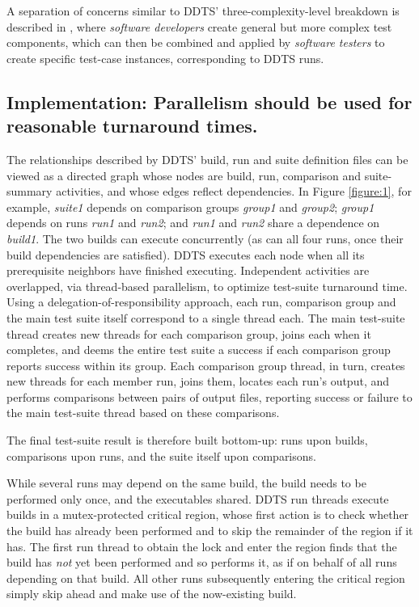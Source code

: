 \documentclass[conference]{IEEEtran}
\begin{document}
A separation of concerns similar to DDTS' three-complexity-level breakdown is described in \cite{rest}, where \emph{software developers} create general but more complex test components, which can then be combined and applied by \emph{software testers} to create specific test-case instances, corresponding to DDTS runs.

\subsection{Implementation: Parallelism should be used for reasonable turnaround times.}

The relationships described by DDTS' build, run and suite definition files can be viewed as a directed graph whose nodes are build, run, comparison and suite-summary activities, and whose edges reflect dependencies. In Figure \ref{figure:1}, for example, \emph{suite1} depends on comparison groups \emph{group1} and \emph{group2}; \emph{group1} depends on runs \emph{run1} and \emph{run2}; and \emph{run1} and \emph{run2} share a dependence on \emph{build1}. The two builds can execute concurrently (as can all four runs, once their build dependencies are satisfied). DDTS executes each node when all its prerequisite neighbors have finished executing. Independent activities are overlapped, via thread-based parallelism, to optimize test-suite turnaround time. Using a delegation-of-responsibility approach, each run, comparison group and the main test suite itself correspond to a single thread each. The main test-suite thread creates new threads for each comparison group, joins each when it completes, and deems the entire test suite a success if each comparison group reports success within its group. Each comparison group thread, in turn, creates new threads for each member run, joins them, locates each run's output, and performs comparisons between pairs of output files, reporting success or failure to the main test-suite thread based on these comparisons.

The final test-suite result is therefore built bottom-up: runs upon builds, comparisons upon runs, and the suite itself upon comparisons.

While several runs may depend on the same build, the build needs to be performed only once, and the executables shared. DDTS run threads execute builds in a mutex-protected critical region, whose first action is to check whether the build has already been performed and to skip the remainder of the region if it has. The first run thread to obtain the lock and enter the region finds that the build has \emph{not} yet been performed and so performs it, as if on behalf of all runs depending on that build. All other runs subsequently entering the critical region simply skip ahead and make use of the now-existing build.
\end{document}
